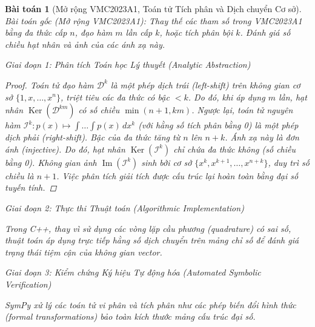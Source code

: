 \documentclass{article}
\newtheorem{baitoan}{Bài toán}
\begin{document}
\begin{baitoan}[Mở rộng VMC2023A1, Toán tử Tích phân và Dịch chuyển Cơ sở]
 \emph{Bài toán gốc (Mở rộng VMC2023A1):} 
 Thay thế các tham số trong VMC2023A1 bằng đa thức cấp $n$, đạo hàm $m$ lần cấp $k$, hoặc tích phân bội $k$. Đánh giá số chiều hạt nhân và ảnh của các ánh xạ này.

\vspace{0.5em}\noindent\emph{Giai đoạn 1: Phân tích Toán học Lý thuyết (Analytic Abstraction)}
 
 \begin{proof}
 Toán tử đạo hàm $\mathcal{D}^k$ là một phép dịch trái (left-shift) trên không gian cơ sở $\{1, x, \dots, x^n\}$, triệt tiêu các đa thức có bậc $< k$. Do đó, khi áp dụng $m$ lần, hạt nhân $\operatorname{Ker}(\mathcal{D}^{km})$ có số chiều $\min(n+1, km)$. 
 Ngược lại, toán tử nguyên hàm $\mathcal{I}^k: p(x) \mapsto \int \dots \int p(x) \, dx^k$ (với hằng số tích phân bằng 0) là một phép dịch phải (right-shift). Bậc của đa thức tăng từ $n$ lên $n+k$. Ánh xạ này là đơn ánh (injective). Do đó, hạt nhân $\operatorname{Ker}(\mathcal{I}^k)$ chỉ chứa đa thức không (số chiều bằng 0). Không gian ảnh $\operatorname{Im}(\mathcal{I}^k)$ sinh bởi cơ sở $\{x^k, x^{k+1}, \dots, x^{n+k}\}$, duy trì số chiều là $n+1$. Việc phân tích giải tích được cấu trúc lại hoàn toàn bằng đại số tuyến tính.
 \end{proof}

\vspace{0.5em}\noindent\emph{Giai đoạn 2: Thực thi Thuật toán (Algorithmic Implementation)}
 
 Trong C++, thay vì sử dụng các vòng lặp cầu phương (quadrature) có sai số, thuật toán áp dụng trực tiếp hằng số dịch chuyển trên mảng chỉ số để đánh giá trạng thái tiệm cận của không gian vector.



\vspace{0.5em}\noindent\emph{Giai đoạn 3: Kiểm chứng Ký hiệu Tự động hóa (Automated Symbolic Verification)}
 
 \textsf{SymPy} xử lý các toán tử vi phân và tích phân như các phép biến đổi hình thức (formal transformations) bảo toàn kích thước mảng cấu trúc đại số.




\end{baitoan}
\end{document}
